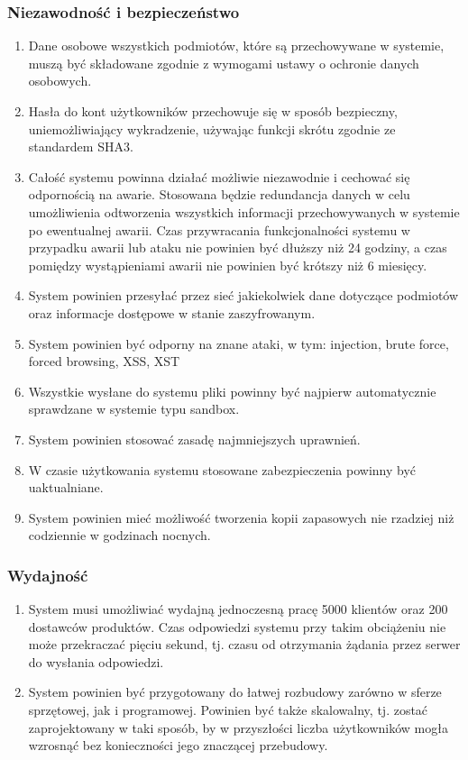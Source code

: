 \documentclass[11pt,a4paper,twoside]{article}
\begin{document}
\subsubsection{Niezawodność i bezpieczeństwo}
\begin{enumerate}[start=2,label={WNF\arabic*.}]
\item Dane osobowe wszystkich podmiotów, które są przechowywane w systemie, muszą być składowane zgodnie z wymogami ustawy o ochronie danych osobowych. 
\item Hasła do kont użytkowników przechowuje się w sposób bezpieczny, uniemożliwiający wykradzenie, używając funkcji skrótu zgodnie ze standardem SHA3.
\item Całość systemu powinna działać możliwie niezawodnie i cechować się odpornością na awarie. Stosowana będzie redundancja danych w celu umożliwienia odtworzenia wszystkich informacji przechowywanych w systemie po ewentualnej awarii. Czas przywracania funkcjonalności systemu w przypadku awarii lub ataku nie powinien być dłuższy niż 24 godziny, a czas pomiędzy wystąpieniami awarii nie powinien być krótszy niż 6 miesięcy.
\item System powinien przesyłać przez sieć jakiekolwiek dane dotyczące podmiotów oraz informacje dostępowe w stanie zaszyfrowanym.
\item System powinien być odporny na znane ataki, w tym:  injection, brute force, forced browsing, XSS, XST
\item Wszystkie wysłane do systemu pliki powinny być najpierw automatycznie sprawdzane w systemie typu sandbox.
\item System powinien stosować zasadę najmniejszych uprawnień.
\item W czasie użytkowania systemu stosowane zabezpieczenia powinny być uaktualniane.
\item System powinien mieć możliwość tworzenia kopii zapasowych nie rzadziej niż codziennie w godzinach nocnych.
\end{enumerate}
\subsubsection{Wydajność}
\begin{enumerate}[start=11,label={WNF\arabic*.}]
\item System musi umożliwiać wydajną jednoczesną pracę 5000 klientów oraz 200 dostawców produktów. Czas odpowiedzi systemu przy takim obciążeniu nie może przekraczać pięciu sekund, tj. czasu od otrzymania żądania przez serwer do wysłania odpowiedzi.
\item System powinien być przygotowany do łatwej rozbudowy zarówno w sferze sprzętowej, jak i programowej. Powinien być także skalowalny, tj. zostać zaprojektowany w taki sposób, by w przyszłości liczba użytkowników mogła wzrosnąć bez konieczności jego znaczącej przebudowy.
\end{enumerate}
\end{document}
